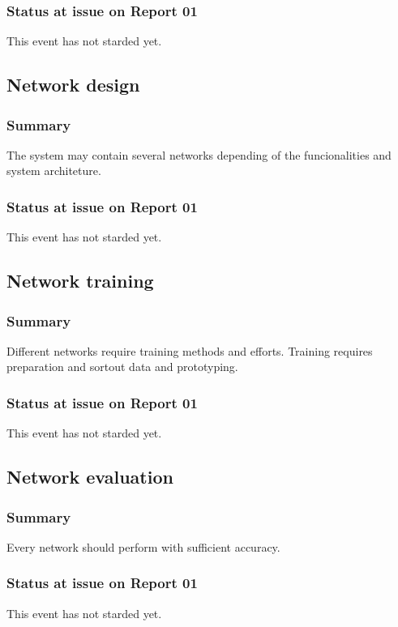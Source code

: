 \documentclass{article}
\begin{document}
\subsubsection{Status at issue on Report 01}
\label{sec:orgaf98530}
This event has not starded yet.

\subsection{Network design}
\label{sec:orgc964948}
\subsubsection{Summary}
\label{sec:org4a5bf7b}
The system may contain several networks depending of the funcionalities and system architeture.

\subsubsection{Status at issue on Report 01}
\label{sec:orgdedeb38}
This event has not starded yet.

\subsection{Network training}
\label{sec:orgce82991}
\subsubsection{Summary}
\label{sec:orgd2b32bb}
Different networks require training methods and efforts.
Training requires preparation and sortout data and prototyping.

\subsubsection{Status at issue on Report 01}
\label{sec:org50f34e0}
This event has not starded yet.

\subsection{Network evaluation}
\label{sec:org2c34ca7}
\subsubsection{Summary}
\label{sec:orga159037}
Every network should perform with sufficient accuracy.
\subsubsection{Status at issue on Report 01}
\label{sec:org10feff4}
This event has not starded yet.
\end{document}
